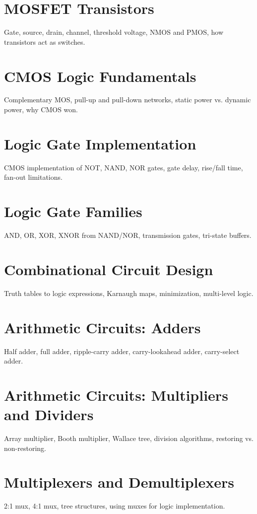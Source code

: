 \chapter{MOSFET Transistors}
Gate, source, drain, channel, threshold voltage, NMOS and PMOS, how transistors act as switches.

\chapter{CMOS Logic Fundamentals}
Complementary MOS, pull-up and pull-down networks, static power vs. dynamic power, why CMOS won.

\chapter{Logic Gate Implementation}
CMOS implementation of NOT, NAND, NOR gates, gate delay, rise/fall time, fan-out limitations.

\chapter{Logic Gate Families}
AND, OR, XOR, XNOR from NAND/NOR, transmission gates, tri-state buffers.

\chapter{Combinational Circuit Design}
Truth tables to logic expressions, Karnaugh maps, minimization, multi-level logic.


\chapter{Arithmetic Circuits: Adders}
Half adder, full adder, ripple-carry adder, carry-lookahead adder, carry-select adder.

\chapter{Arithmetic Circuits: Multipliers and Dividers}
Array multiplier, Booth multiplier, Wallace tree, division algorithms, restoring vs. non-restoring.

\chapter{Multiplexers and Demultiplexers}
2:1 mux, 4:1 mux, tree structures, using muxes for logic implementation.

